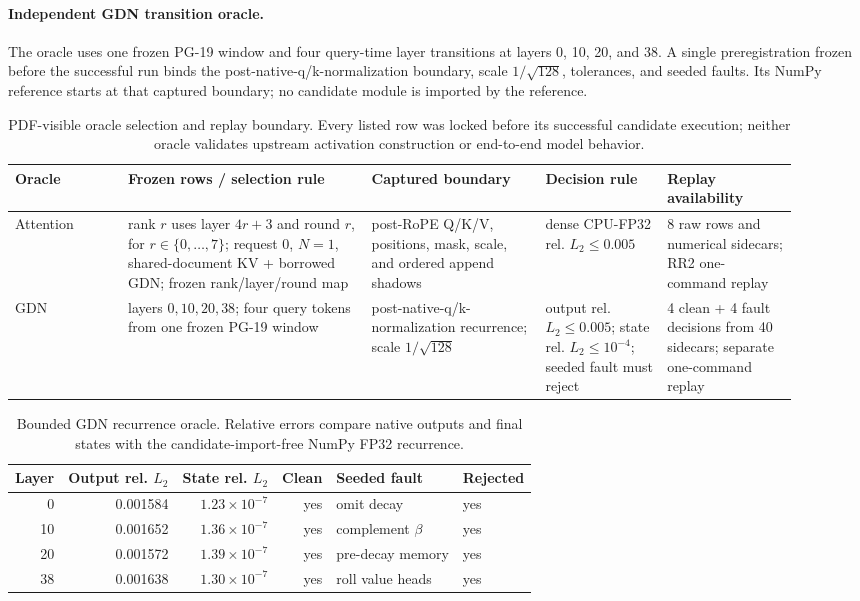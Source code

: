 \documentclass{article}
\begin{document}
\paragraph{Independent GDN transition oracle.}
The oracle uses one frozen PG-19 window and four query-time layer transitions
at layers 0, 10, 20, and 38.  A single preregistration frozen before the
successful run binds the post-native-q/k-normalization boundary, scale
$1/\sqrt{128}$, tolerances, and seeded faults.  Its NumPy reference starts at
that captured boundary; no candidate module is imported by the reference.

\begin{table}[H]
\caption{PDF-visible oracle selection and replay boundary.  Every listed row
was locked before its successful candidate execution; neither oracle validates
upstream activation construction or end-to-end model behavior.}
\label{tab:oracle-selection}
\centering\scriptsize
\setlength{\tabcolsep}{3pt}
\begin{tabular}{@{}p{0.13\linewidth}p{0.29\linewidth}p{0.20\linewidth}p{0.14\linewidth}p{0.15\linewidth}@{}}
\toprule
Oracle & Frozen rows / selection rule & Captured boundary & Decision rule & Replay availability \\
\midrule
Attention & rank $r$ uses layer $4r+3$ and round $r$, for
$r\in\{0,\ldots,7\}$; request 0, $N=1$, shared-document KV + borrowed GDN;
frozen rank/layer/round map
& post-RoPE Q/K/V, positions, mask, scale, and ordered append shadows
& dense CPU-FP32 rel. $L_2\leq0.005$
& 8 raw rows and numerical sidecars; RR2 one-command replay \\
GDN & layers $0,10,20,38$; four query tokens from one frozen PG-19 window
& post-native-q/k-normalization recurrence; scale $1/\sqrt{128}$
& output rel. $L_2\leq0.005$; state rel. $L_2\leq10^{-4}$; seeded fault must reject
& 4 clean + 4 fault decisions from 40 sidecars; separate one-command replay \\
\bottomrule
\end{tabular}
\end{table}

\begin{table}[H]
\caption{Bounded GDN recurrence oracle.  Relative errors compare native outputs
and final states with the candidate-import-free NumPy FP32 recurrence.}
\label{tab:gdn-oracle}
\centering\small
\begin{tabular}{@{}rrrrll@{}}
\toprule
Layer & Output rel. $L_2$ & State rel. $L_2$ & Clean & Seeded fault & Rejected \\
\midrule
0  & 0.001584 & $1.23\times10^{-7}$ & yes & omit decay & yes \\
10 & 0.001652 & $1.36\times10^{-7}$ & yes & complement $\beta$ & yes \\
20 & 0.001572 & $1.39\times10^{-7}$ & yes & pre-decay memory & yes \\
38 & 0.001638 & $1.30\times10^{-7}$ & yes & roll value heads & yes \\
\bottomrule
\end{tabular}
\end{table}
\end{document}
